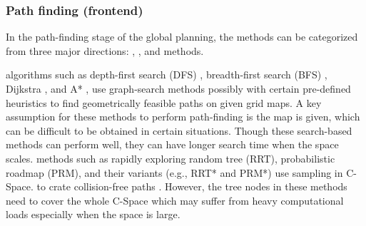 \documentclass[letterpaper,journal,twoside]{IEEEtran}
\begin{document}
\subsubsection{Path finding (frontend)}

In the path-finding stage of the global planning, 
the methods can be categorized 
from three major directions: , 
, and  methods. 


% 
 algorithms such as depth-first 
search (DFS) \cite{cormen2022introduction}, 
breadth-first search (BFS) \cite{cormen2022introduction}, 
Dijkstra \cite{wang2011application}, and 
A* \cite{hart1968formal}, use graph-search methods 
possibly with certain pre-defined heuristics to find 
geometrically feasible paths on given grid maps. 
A key assumption for these methods to perform path-finding 
is the map is given, which can be difficult to be obtained 
in certain situations. 
Though these search-based methods can perform well, they 
can have longer search time when the space scales.
 methods such as rapidly exploring random 
tree (RRT), probabilistic roadmap (PRM), and their 
variants (e.g., RRT* and PRM*) use sampling in C-Space. 
to crate collision-free paths \cite{lavalle2001rapidly,
karaman2011sampling,kavraki1996probabilistic}. 
% 
However, the tree nodes in these methods need to cover the 
whole C-Space which may suffer from heavy computational 
loads especially when the space is large.  
\end{document}
